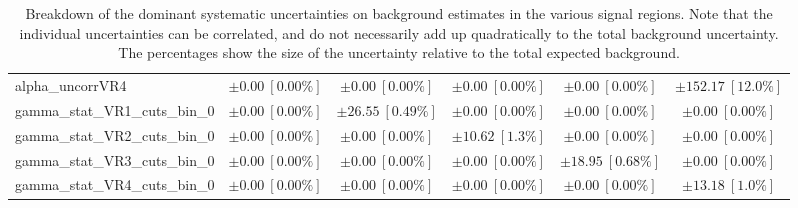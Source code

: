 \begin{table}
\begin{tabular*}{\textwidth}{@{\extracolsep{\fill}}lccccc}
alpha\_uncorrVR4         & $\pm 0.00\ [0.00\%] $          & $\pm 0.00\ [0.00\%] $          & $\pm 0.00\ [0.00\%] $          & $\pm 0.00\ [0.00\%] $          & $\pm 152.17\ [12.0\%] $       \\
gamma\_stat\_VR1\_cuts\_bin\_0         & $\pm 0.00\ [0.00\%] $          & $\pm 26.55\ [0.49\%] $          & $\pm 0.00\ [0.00\%] $          & $\pm 0.00\ [0.00\%] $          & $\pm 0.00\ [0.00\%] $       \\
gamma\_stat\_VR2\_cuts\_bin\_0         & $\pm 0.00\ [0.00\%] $          & $\pm 0.00\ [0.00\%] $          & $\pm 10.62\ [1.3\%] $          & $\pm 0.00\ [0.00\%] $          & $\pm 0.00\ [0.00\%] $       \\
gamma\_stat\_VR3\_cuts\_bin\_0         & $\pm 0.00\ [0.00\%] $          & $\pm 0.00\ [0.00\%] $          & $\pm 0.00\ [0.00\%] $          & $\pm 18.95\ [0.68\%] $          & $\pm 0.00\ [0.00\%] $       \\
gamma\_stat\_VR4\_cuts\_bin\_0         & $\pm 0.00\ [0.00\%] $          & $\pm 0.00\ [0.00\%] $          & $\pm 0.00\ [0.00\%] $          & $\pm 0.00\ [0.00\%] $          & $\pm 13.18\ [1.0\%] $       \\

\bottomrule
\end{tabular*}
\caption{Breakdown of the dominant systematic uncertainties on background estimates in the various signal regions.
Note that the individual uncertainties can be correlated, and do not necessarily add up quadratically to
the total background uncertainty. The percentages show the size of the uncertainty relative to the total expected background.}
\label{table.results.bkgestimate.uncertainties.CR_VR1_VR2_VR3_VR4}
\end{table}